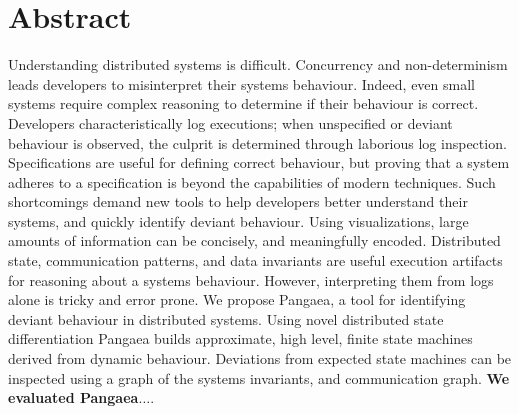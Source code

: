 
\section{Abstract}
\label{sec:abstract}


Understanding distributed systems is difficult. Concurrency and
non-determinism leads developers to misinterpret their systems
behaviour. Indeed, even small systems require complex reasoning to
determine if their behaviour is correct.  Developers
characteristically log executions; when unspecified or deviant
behaviour is observed, the culprit is determined through laborious log
inspection. Specifications are useful for defining correct behaviour,
but proving that a system adheres to a specification is beyond the
capabilities of modern techniques.  Such shortcomings demand new tools
to help developers better understand their systems, and quickly
identify deviant behaviour.  Using visualizations, large amounts of
information can be concisely, and meaningfully encoded. Distributed
state, communication patterns, and data invariants are useful
execution artifacts for reasoning about a systems behaviour.  However,
interpreting them from logs alone is tricky and error prone.  We
propose Pangaea, a tool for identifying deviant behaviour in
distributed systems.  Using novel distributed state differentiation
Pangaea builds approximate, high level, finite state machines derived
from dynamic behaviour. Deviations from expected state machines can be
inspected using a graph of the systems invariants, and communication
graph. \textbf{We evaluated Pangaea$\dots$}.

